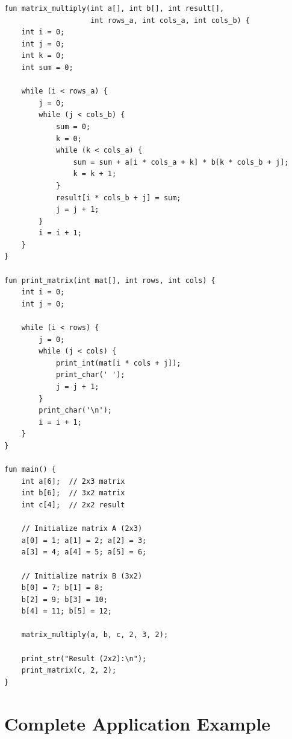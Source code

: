 \documentclass[12pt,a4paper,oneside]{book}
\begin{document}
\begin{lstlisting}[style=algo, caption={Matrix Multiplication}]
fun matrix_multiply(int a[], int b[], int result[], 
                    int rows_a, int cols_a, int cols_b) {
    int i = 0;
    int j = 0;
    int k = 0;
    int sum = 0;
    
    while (i < rows_a) {
        j = 0;
        while (j < cols_b) {
            sum = 0;
            k = 0;
            while (k < cols_a) {
                sum = sum + a[i * cols_a + k] * b[k * cols_b + j];
                k = k + 1;
            }
            result[i * cols_b + j] = sum;
            j = j + 1;
        }
        i = i + 1;
    }
}

fun print_matrix(int mat[], int rows, int cols) {
    int i = 0;
    int j = 0;
    
    while (i < rows) {
        j = 0;
        while (j < cols) {
            print_int(mat[i * cols + j]);
            print_char(' ');
            j = j + 1;
        }
        print_char('\n');
        i = i + 1;
    }
}

fun main() {
    int a[6];  // 2x3 matrix
    int b[6];  // 3x2 matrix
    int c[4];  // 2x2 result
    
    // Initialize matrix A (2x3)
    a[0] = 1; a[1] = 2; a[2] = 3;
    a[3] = 4; a[4] = 5; a[5] = 6;
    
    // Initialize matrix B (3x2)
    b[0] = 7; b[1] = 8;
    b[2] = 9; b[3] = 10;
    b[4] = 11; b[5] = 12;
    
    matrix_multiply(a, b, c, 2, 3, 2);
    
    print_str("Result (2x2):\n");
    print_matrix(c, 2, 2);
}
\end{lstlisting}

\section{Complete Application Example}
\end{document}
